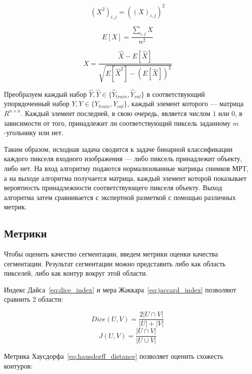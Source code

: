 \begin{equation}
\label{eq:input_squared}
(X^{2})_{i,j}=((X)_{i,j})^{2}
\end{equation}

\begin{equation}
\label{eq:input_expected_value}
E[X]=\frac{
  \sum_{i,j}X
}{
  n^{2}
}
\end{equation} 

\begin{equation}
\label{eq:input_normalized}
X = \frac{
  \hat{X} - E[\hat{X}]
}{\sqrt{
  E[\hat{X}^{2}] - (E[\hat{X}])^2
}}
\end{equation}

Преобразуем каждый набор $\hat{Y},\hat{Y}\in{}\{\hat{Y}_{train},\hat{Y}_{val}\}$ в соответствующий упорядоченный набор $Y,Y\in{}\{Y_{train},Y_{val}\}$, каждый элемент которого — матрица $R^{n\times{}n}$. Каждый элемент последней, в свою очередь, является числом $1$ или $0$, в зависимости от того, принадлежит ли соответствующий пиксель заданному \mbox{$m$-угольнику} или нет.

Таким образом, исходная задача сводится к задаче бинарной классификации каждого пикселя входного изображения — либо пиксель принадлежит объекту, либо нет. На вход алгоритму подаются нормализованные матрицы снимков МРТ, а на выходе алгоритма получается матрица, каждый элемент которой показывает вероятность принадлежности соответствующего пикселя объекту. Выход алгоритма затем сравнивается с экспертной разметкой с помощью различных метрик.

\subsection{Метрики}

Чтобы оценить качество сегментации, введем метрики оценки качества сегментации. Результат сегментации можно представить либо как область пикселей, либо как контур вокруг этой области. 

Индекс Дайса~\eqref{eq:dice_index} и мера Жаккара~\eqref{eq:jaccard_index} позволяют сравнить 2 области:

\begin{equation}\label{eq:dice_index}
  Dice(U,V) = \frac{2|U\cap{}V|}{|U| + |V|}
\end{equation}
\begin{equation}\label{eq:jaccard_index}
  J(U,V) = \frac{|U\cap{}V|}{|U\cup{}V|}
\end{equation}

Метрика Хаусдорфа~\eqref{eq:hausdorff_distance} позволяет оценить схожесть контуров:

